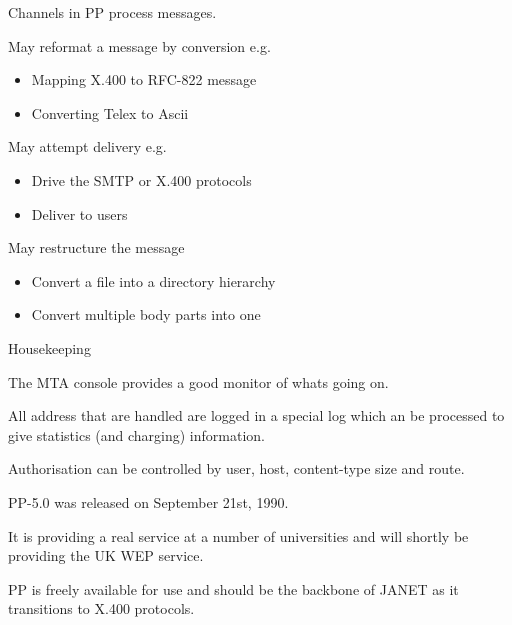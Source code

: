 \begin{bwslide}
\begin{nrtc}
\item	Channels in PP process messages.

\item	May reformat a message by conversion e.g.
	\begin{itemize}
	\item	Mapping X.400 to RFC-822 message
	\item	Converting Telex to Ascii
	\end{itemize}
\item	May attempt delivery e.g.
	\begin{itemize}
	\item	Drive the SMTP or X.400 protocols
	\item	Deliver to users
	\end{itemize}
\item	May restructure the message
	\begin{itemize}
	\item	Convert a file into a directory hierarchy
	\item	Convert multiple body parts into one
	\end{itemize}
\item	Housekeeping
\end{nrtc}
\end{bwslide}

\begin{bwslide}
\begin{nrtc}
\item The MTA console provides a good monitor of whats going on.
\item All address that are handled are logged in a special log which
an be processed to give statistics (and charging) information.
\item Authorisation can be controlled by user, host, content-type size
and route.
\end{nrtc}
\end{bwslide}

\begin{bwslide}
\begin{nrtc}
\item	PP-5.0 was released on September 21st, 1990.

\item	It is providing a real service at a number of universities and
	will shortly be providing the UK WEP service.

\item	PP is freely available for use and should be the backbone of
	JANET as it transitions to X.400 protocols.

\end{nrtc}
\end{bwslide}

